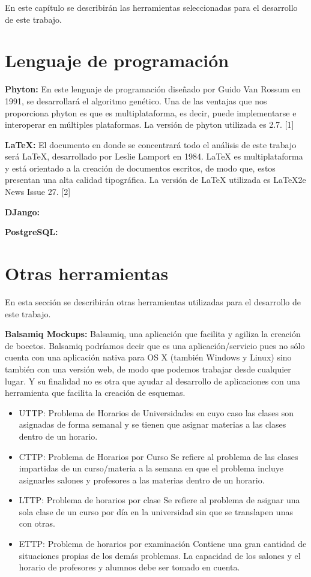 \label{sec:seleccionHerramientas}
	
	En este capítulo se describirán las herramientas seleccionadas para el desarrollo de este trabajo. 
	
	\section{Lenguaje de programación}
		\textbf{Phyton:} En este lenguaje de programación diseñado por Guido Van Rossum en 1991, se desarrollará el algoritmo genético. Una de las ventajas que nos proporciona phyton es que es multiplataforma, es decir, puede implementarse e interoperar en múltiples plataformas. La versión de phyton utilizada es 2.7. [1]
	
		\textbf{LaTeX:} El documento en donde se concentrará todo el análisis de este trabajo será LaTeX, desarrollado por Leslie Lamport en 1984. LaTeX es multiplataforma y está orientado a la creación de documentos escritos, de modo que, estos  presentan una alta calidad tipográfica. La versión de LaTeX utilizada es LaTeX2e News Issue 27. [2]
		
		\textbf{DJango:}
		
		\textbf{PostgreSQL:}
	
	\section{Otras herramientas}
		En esta sección se describirán otras herramientas utilizadas para el desarrollo de este trabajo.
		
		\textbf{Balsamiq Mockups:} Balsamiq, una aplicación que facilita y agiliza la creación de bocetos.
		Balsamiq podríamos decir que es una aplicación/servicio pues no sólo cuenta con una aplicación nativa para OS X (también Windows y Linux) sino también con una versión web, de modo que podemos trabajar desde cualquier lugar. Y su finalidad no es otra que ayudar al desarrollo de aplicaciones con una herramienta que facilita la creación de esquemas.
	
	
	\begin{itemize}
		\item UTTP: Problema de Horarios de Universidades
		en cuyo caso las clases son asignadas de forma semanal y se tienen que asignar materias a las clases dentro de un horario.
		
		\item CTTP: Problema de Horarios por Curso
		Se refiere al problema de las clases impartidas de un curso/materia a la semana en que el problema incluye asignarles salones y profesores a las materias dentro de un horario.
		
		\item LTTP: Problema de horarios por clase
		Se refiere al problema de asignar una sola clase de un curso por día en la universidad sin que se translapen unas con otras.
		
		\item ETTP: Problema de horarios por examinación
		Contiene una gran cantidad de situaciones propias de los demás problemas. La capacidad de los salones y el horario de profesores y alumnos debe ser tomado en cuenta.
	\end{itemize}
	

